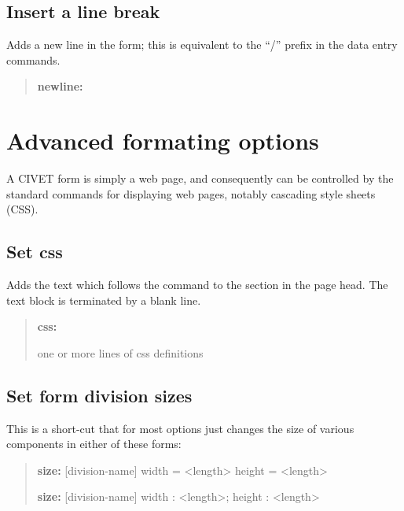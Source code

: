 \documentclass[letterpaper,10pt,english]{sphinxmanual}
\begin{document}
\subsection{Insert a line break}
\label{forms:insert-a-line-break}
Adds a new line in the form; this is equivalent to the “/” prefix in the
data entry commands.
\begin{quote}

\textbf{newline:}
\end{quote}


\section{Advanced formating options}
\label{forms:advanced-formating-options}
A CIVET form is simply a web page, and consequently can be controlled by
the standard commands for displaying web pages, notably cascading style sheets (CSS).


\subsection{Set css}
\label{forms:set-css}
Adds the text which follows the command to the  section
in the page head. The text block is terminated by a blank line.
\begin{quote}

\begin{DUlineblock}{0em}
\item[] \textbf{css:}
\item[] one or more lines of css definitions
\end{DUlineblock}
\end{quote}


\subsection{Set form division sizes}
\label{forms:set-form-division-sizes}
This is a short-cut that for most options just changes the size of various components in either of these
forms:
\begin{quote}

\begin{DUlineblock}{0em}
\item[] \textbf{size:} {[}division-name{]} width = \textless{}length\textgreater{} height = \textless{}length\textgreater{}
\item[] \textbf{size:} {[}division-name{]} width : \textless{}length\textgreater{}; height : \textless{}length\textgreater{}
\end{DUlineblock}
\end{quote}
\end{document}
